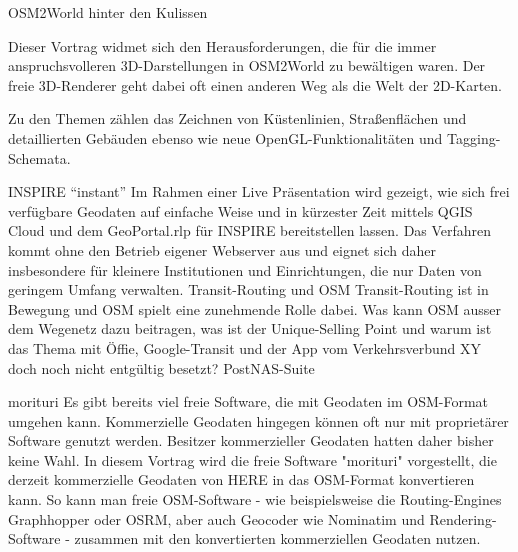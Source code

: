 %
{OSM2World hinter den Kulissen}%
{}%
{Dieser Vortrag widmet sich den Herausforderungen, die für die immer anspruchsvolleren 3D-Darstellungen in
OSM2World zu bewältigen waren. Der freie 3D-Renderer geht dabei oft einen anderen Weg als die Welt der 2D-Karten.

Zu den Themen zählen das Zeichnen von Küstenlinien, Straßenflächen und detaillierten Gebäuden ebenso wie neue
OpenGL-Funktionalitäten und Tagging-Schemata.}
%
%
{INSPIRE "`instant"'}%
{}%
{Im Rahmen einer Live Präsentation wird gezeigt, wie sich frei verfügbare Geodaten auf einfache Weise und
in kürzester Zeit mittels QGIS Cloud und dem GeoPortal.rlp für INSPIRE bereitstellen lassen.
Das Verfahren kommt ohne den Betrieb eigener Webserver aus und eignet sich daher insbesondere
für kleinere Institutionen und Einrichtungen, die nur Daten von geringem Umfang verwalten.}
%
%
{Transit-Routing und OSM}%
{}%
{Transit-Routing ist in Bewegung und OSM spielt eine zunehmende Rolle dabei. Was kann OSM ausser dem Wegenetz dazu beitragen, was ist der Unique-Selling Point und warum ist das Thema mit Öffie, Google-Transit und der App vom Verkehrsverbund XY doch noch nicht entgültig besetzt?}
%
%
{PostNAS-Suite}%
{}%
{}

%
{morituri}%
{}%
{Es gibt bereits viel freie Software, die mit Geodaten im OSM-Format umgehen kann.
Kommerzielle Geodaten hingegen können oft nur mit proprietärer Software genutzt werden.
Besitzer kommerzieller Geodaten hatten daher bisher keine Wahl.
In diesem Vortrag wird die freie Software "morituri" vorgestellt, die derzeit kommerzielle Geodaten von HERE in das OSM-Format konvertieren kann.
So kann man freie OSM-Software - wie beispielsweise die Routing-Engines Graphhopper oder OSRM, aber auch Geocoder wie Nominatim und Rendering-Software - zusammen mit den konvertierten kommerziellen Geodaten nutzen.}


